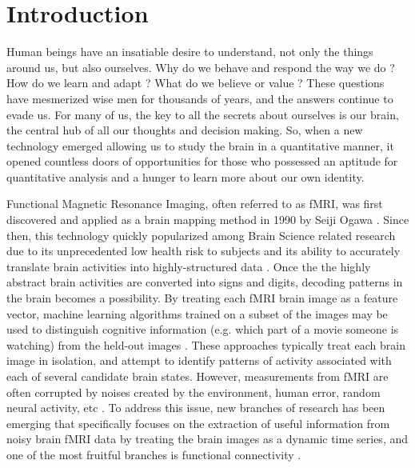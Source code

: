 \documentclass[12pt]{article}
\begin{document}
\section{Introduction}
Human beings have an insatiable desire to understand, not only the things around us, but also ourselves. Why do we behave and respond the way we do \cite{hasson2012}? How do we learn and adapt \cite{hasson2004}\cite{hasson2005}? What do we believe or value \cite{Greene01}? These questions have mesmerized wise men for thousands of years, and the answers continue to evade us. For many of us, the key to all the secrets about ourselves is our brain, the central hub of all our thoughts and decision making. So, when a new technology emerged allowing us to study the brain in a quantitative manner, it opened countless doors of opportunities for those who possessed an aptitude for quantitative analysis and a hunger to learn more about our own identity.

Functional Magnetic Resonance Imaging, often referred to as fMRI, was first discovered and applied as a brain mapping method in 1990 by Seiji Ogawa \cite{Ogawa90}. Since then, this technology quickly popularized among Brain Science related research due to its unprecedented low health risk to subjects and its ability to accurately translate brain activities into highly-structured data \cite{Logothetis01}. Once the the highly abstract brain activities are converted into signs and digits, decoding patterns in the brain becomes a possibility. By treating each fMRI brain image as a feature vector, machine learning algorithms trained on a subset of the images may be used to distinguish cognitive information (e.g. which part of a movie someone is watching) from the held-out images \cite{Norman06}\cite{peterson12}\cite{peterson17}. These approaches typically treat each brain image in isolation, and attempt to identify patterns of activity associated with each of several candidate brain states. However, measurements from fMRI are often corrupted by noises created by the environment, human error, random neural activity, etc \cite{peterson11}. To address this issue, new branches of research has been emerging that specifically focuses on the extraction of useful information from noisy brain fMRI data by treating the brain images as a dynamic time series, and one of the most fruitful branches is functional connectivity \cite{peterson9} \cite{peterson19} \cite{peterson20}.
\end{document}
